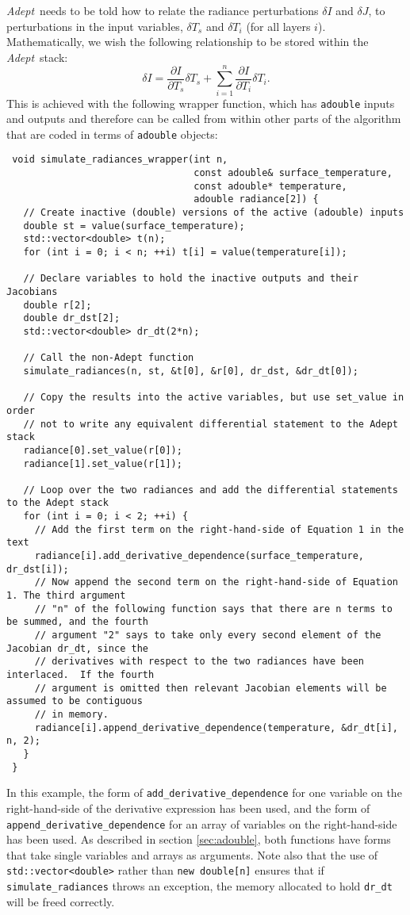 \documentclass[a4,oneside]{book}
\def\codesize{\small}
\def\Adept{\emph{Adept}}
\def\code#1{{\codesize\texttt{#1}}}
\begin{document}
\Adept\ needs to be told how to relate the radiance perturbations
$\delta I$ and $\delta J$, to perturbations in the input
variables, $\delta T_s$ and $\delta T_i$ (for all layers
$i$). Mathematically, we wish the following relationship to be stored
within the \Adept\ stack:
%
\begin{equation}
\delta I = \frac{\partial I}{\partial T_s}\delta
T_s+\sum_{i=1}^n\frac{\partial I}{\partial T_i}\delta T_i.\nonumber
\end{equation}
%
This is achieved with the following wrapper function, which has
\code{adouble} inputs and outputs and therefore can be called from
within other parts of the algorithm that are coded in terms of
\code{adouble} objects:
%
\begin{lstlisting}
 void simulate_radiances_wrapper(int n,
                                 const adouble& surface_temperature,
                                 const adouble* temperature,
                                 adouble radiance[2]) {
   // Create inactive (double) versions of the active (adouble) inputs
   double st = value(surface_temperature);
   std::vector<double> t(n);
   for (int i = 0; i < n; ++i) t[i] = value(temperature[i]);

   // Declare variables to hold the inactive outputs and their Jacobians
   double r[2];
   double dr_dst[2];
   std::vector<double> dr_dt(2*n);

   // Call the non-Adept function
   simulate_radiances(n, st, &t[0], &r[0], dr_dst, &dr_dt[0]);

   // Copy the results into the active variables, but use set_value in order
   // not to write any equivalent differential statement to the Adept stack
   radiance[0].set_value(r[0]);
   radiance[1].set_value(r[1]);

   // Loop over the two radiances and add the differential statements to the Adept stack
   for (int i = 0; i < 2; ++i) {
     // Add the first term on the right-hand-side of Equation 1 in the text
     radiance[i].add_derivative_dependence(surface_temperature, dr_dst[i]);
     // Now append the second term on the right-hand-side of Equation 1. The third argument
     // "n" of the following function says that there are n terms to be summed, and the fourth 
     // argument "2" says to take only every second element of the Jacobian dr_dt, since the 
     // derivatives with respect to the two radiances have been interlaced.  If the fourth 
     // argument is omitted then relevant Jacobian elements will be assumed to be contiguous
     // in memory.
     radiance[i].append_derivative_dependence(temperature, &dr_dt[i], n, 2);
   }
 }
\end{lstlisting}
%
In this example, the form of \code{add\_derivative\_dependence} for
one variable on the right-hand-side of the derivative expression has
been used, and the form of \code{append\_derivative\_dependence} for
an array of variables on the right-hand-side has been used. As
described in section \ref{sec:adouble}, both functions have forms that
take single variables and arrays as arguments. Note also that the use
of \code{std::vector<double>} rather than \code{new double[n]} ensures
that if \code{simulate\_radiances} throws an exception, the memory
allocated to hold \code{dr\_dt} will be freed correctly.
\end{document}
